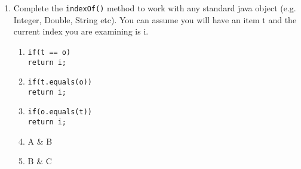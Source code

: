 \documentclass[S17-Final.tex]{subfiles}
\begin{document}
\begin{enumerate}
\item Complete the \texttt{indexOf()} method to work with any standard java object (e.g. Integer, Double, String etc). You can assume you will have an item t and the current index you are examining is i.
	
\begin{enumerate}
\item  \texttt{if(t == o)\\
    return i;}
\item  \texttt{if(t.equals(o))\\
    return i;}
\item  \texttt{if(o.equals(t))\\
    return i;}
\item  A \& B
\item  B \& C \ifdraft \Ans \fi 
\end{enumerate}

    
    
    
	





\end{enumerate}
\end{document}
